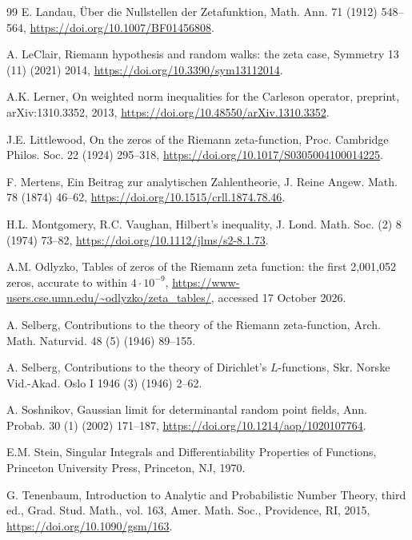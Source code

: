 \documentclass[preprint,12pt]{elsarticle}
\numberwithin{equation}{section}
\theoremstyle{plain}
\theoremstyle{definition}
\theoremstyle{remark}
\begin{document}
\begin{thebibliography}{99}
E. Landau, \"Uber die Nullstellen der Zetafunktion, Math. Ann. 71 (1912) 548--564, \href{https://doi.org/10.1007/BF01456808}{https://doi.org/10.1007/BF01456808}.

A. LeClair, Riemann hypothesis and random walks: the zeta case, Symmetry 13 (11) (2021) 2014, \href{https://doi.org/10.3390/sym13112014}{https://doi.org/10.3390/sym13112014}.

A.K. Lerner, On weighted norm inequalities for the Carleson operator, preprint, arXiv:1310.3352, 2013, \href{https://doi.org/10.48550/arXiv.1310.3352}{https://doi.org/10.48550/arXiv.1310.3352}.

J.E. Littlewood, On the zeros of the Riemann zeta-function, Proc. Cambridge Philos. Soc. 22 (1924) 295--318, \href{https://doi.org/10.1017/S0305004100014225}{https://doi.org/10.1017/S0305004100014225}.

F. Mertens, Ein Beitrag zur analytischen Zahlentheorie, J. Reine Angew. Math. 78 (1874) 46--62, \href{https://doi.org/10.1515/crll.1874.78.46}{https://doi.org/10.1515/crll.1874.78.46}.

H.L. Montgomery, R.C. Vaughan, Hilbert's inequality, J. Lond. Math. Soc. (2) 8 (1974) 73--82, \href{https://doi.org/10.1112/jlms/s2-8.1.73}{https://doi.org/10.1112/jlms/s2-8.1.73}.

A.M. Odlyzko, Tables of zeros of the Riemann zeta function: the first 2,001,052 zeros, accurate to within $4\cdot10^{-9}$, \url{https://www-users.cse.umn.edu/~odlyzko/zeta_tables/}, accessed 17 October 2026.

A. Selberg, Contributions to the theory of the Riemann zeta-function, Arch. Math. Naturvid. 48 (5) (1946) 89--155.

A. Selberg, Contributions to the theory of Dirichlet's $L$-functions, Skr. Norske Vid.-Akad. Oslo I 1946 (3) (1946) 2--62.

A. Soshnikov, Gaussian limit for determinantal random point fields, Ann. Probab. 30 (1) (2002) 171--187, \href{https://doi.org/10.1214/aop/1020107764}{https://doi.org/10.1214/aop/1020107764}.

E.M. Stein, Singular Integrals and Differentiability Properties of Functions, Princeton University Press, Princeton, NJ, 1970.

G. Tenenbaum, Introduction to Analytic and Probabilistic Number Theory, third ed., Grad. Stud. Math., vol. 163, Amer. Math. Soc., Providence, RI, 2015, \href{https://doi.org/10.1090/gsm/163}{https://doi.org/10.1090/gsm/163}.


\end{thebibliography}
\end{document}
